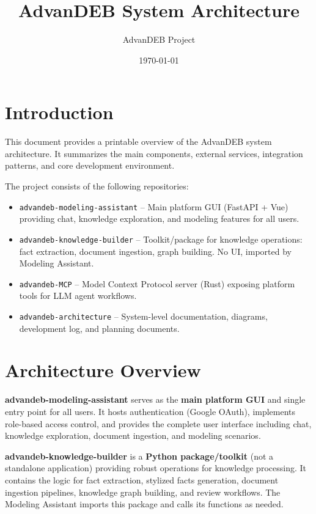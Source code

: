 \documentclass[11pt]{article}
\title{AdvanDEB System Architecture}
\author{AdvanDEB Project}
\date{\today}
\begin{document}
\maketitle

\section{Introduction}

This document provides a printable overview of the AdvanDEB system architecture. It summarizes the main components, external services, integration patterns, and core development environment.

The project consists of the following repositories:

\begin{itemize}[noitemsep]
  \item \texttt{advandeb-modeling-assistant} -- Main platform GUI (FastAPI + Vue) providing chat, knowledge exploration, and modeling features for all users.
  \item \texttt{advandeb-knowledge-builder} -- Toolkit/package for knowledge operations: fact extraction, document ingestion, graph building. No UI, imported by Modeling Assistant.
  \item \texttt{advandeb-MCP} -- Model Context Protocol server (Rust) exposing platform tools for LLM agent workflows.
  \item \texttt{advandeb-architecture} -- System-level documentation, diagrams, development log, and planning documents.
\end{itemize}

\section{Architecture Overview}

\textbf{advandeb-modeling-assistant} serves as the \textbf{main platform GUI} and single entry point for all users. It hosts authentication (Google OAuth), implements role-based access control, and provides the complete user interface including chat, knowledge exploration, document ingestion, and modeling scenarios.

\textbf{advandeb-knowledge-builder} is a \textbf{Python package/toolkit} (not a standalone application) providing robust operations for knowledge processing. It contains the logic for fact extraction, stylized facts generation, document ingestion pipelines, knowledge graph building, and review workflows. The Modeling Assistant imports this package and calls its functions as needed.
\end{document}
